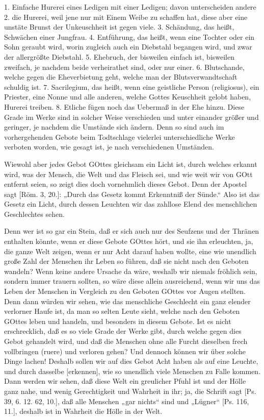 1. Einfache Hurerei eines Ledigen mit einer Ledigen; davon unterscheiden andere 2. die Hurerei, weil jene nur mit Einem Weibe zu schaffen hat, diese aber eine unstäte Brunst der Unkeuschheit ist gegen viele. 3. Schändung, das heißt, Schwächen einer Jungfrau. 4. Entführung, das heißt, wenn eine Tochter oder ein Sohn geraubt wird, worin zugleich auch ein Diebstahl begangen wird, und zwar der allergrößte Diebstahl. 5. Ehebruch, der bisweilen einfach ist, bisweilen zweifach, je nachdem beide verheirathet sind, oder nur einer. 6. Blutschande, welche gegen die Eheverbietung geht, welche man der Blutsverwandtschaft schuldig ist. 7. Sacrilegium, das heißt, wenn eine geistliche Person (religiosus), ein Priester, eine Nonne und alle anderen, welche Gottes Keuschheit gelobt haben, Hurerei treiben. 8. Etliche fügen noch das Uebermaß in der Ehe hinzu. Diese Grade im Werke sind in solcher Weise
verschieden und unter einander größer und geringer, je nachdem die Umstände sich ändern. Denn so sind auch im vorhergehenden Gebote beim Todtschlage vielerlei unterschiedliche Werke verboten worden, wie gesagt ist, je nach verschiedenen Umständen.

Wiewohl aber jedes Gebot GOttes gleichsam ein Licht ist, durch welches erkannt wird, was der Mensch, die Welt und das Fleisch sei, und wie weit wir von GOtt entfernt seien, so zeigt dies doch vornehmlich dieses Gebot. Denn der Apostel sagt [Röm. 3, 20.]: „Durch das Gesetz kommt Erkenntniß der Sünde.“ Also ist das Gesetz ein Licht, durch dessen Leuchten wir das zahllose Elend des menschlichen Geschlechtes sehen.

Denn wer ist so gar ein Stein, daß er sich auch nur des Seufzens und der Thränen enthalten könnte, wenn er diese Gebote GOttes hört, und sie ihn erleuchten, ja, die ganze Welt zeigen, wenn er nur Acht darauf haben wollte, eine wie unendlich große Zahl der Menschen ihr Leben so führen, daß sie nicht nach den Geboten wandeln? Wenn keine andere Ursache da wäre, weshalb wir niemals fröhlich sein, sondern immer trauern sollten, so wäre diese allein ausreichend, wenn wir uns das Leben der Menschen in Vergleich zu den Geboten GOttes vor Augen stellten. Denn dann würden wir sehen, wie das menschliche Geschlecht ein ganz elender verlorner Haufe ist, da man so selten Leute sieht, welche nach den Geboten GOttes leben und handeln, und besonders in diesem Gebote. Ist es nicht erschrecklich, daß es so viele Grade der Werke gibt, durch welche gegen dies Gebot gehandelt wird, und daß die Menschen ohne alle Furcht dieselben frech vollbringen (ruere) und verloren gehen? Und dennoch können wir über solche Dinge lachen! Deshalb sollen wir auf dies Gebot Acht haben als auf eine Leuchte, und durch dasselbe [erkennen], wie so unendlich viele Menschen zu Falle kommen. Dann werden wir sehen, daß diese Welt ein greulicher Pfuhl ist und der Hölle ganz nahe, und wenig Gerechtigkeit und Wahrheit in ihr; ja, die Schrift sagt [Ps. 39, 6. 12. 62, 10.], daß alle Menschen „gar nichts“ sind und „Lügner“ [Ps. 116, 11.], deshalb ist in Wahrheit die Hölle in der Welt.

